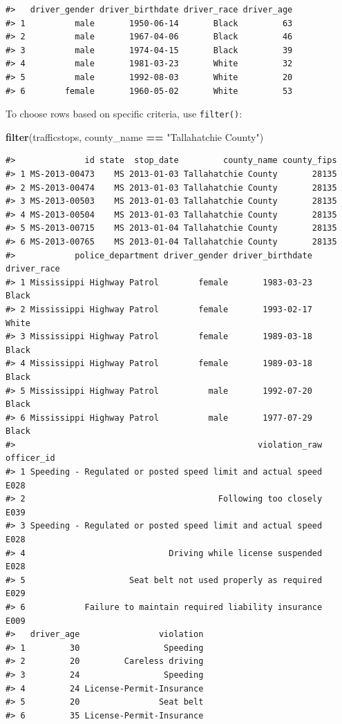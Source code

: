 \documentclass[]{book}
\newenvironment{Shaded}{\begin{snugshade}}{\end{snugshade}}
\newcommand{\KeywordTok}[1]{\textcolor[rgb]{0.13,0.29,0.53}{\textbf{#1}}}
\newcommand{\StringTok}[1]{\textcolor[rgb]{0.31,0.60,0.02}{#1}}
\newcommand{\OperatorTok}[1]{\textcolor[rgb]{0.81,0.36,0.00}{\textbf{#1}}}
\newcommand{\NormalTok}[1]{#1}
\theoremstyle{definition}
\theoremstyle{definition}
\theoremstyle{definition}
\theoremstyle{remark}
\begin{document}
\begin{verbatim}
#>   driver_gender driver_birthdate driver_race driver_age
#> 1          male       1950-06-14       Black         63
#> 2          male       1967-04-06       Black         46
#> 3          male       1974-04-15       Black         39
#> 4          male       1981-03-23       White         32
#> 5          male       1992-08-03       White         20
#> 6        female       1960-05-02       White         53
\end{verbatim}

To choose rows based on specific criteria, use \texttt{filter()}:

\begin{Shaded}
\begin{Highlighting}[]
\KeywordTok{filter}\NormalTok{(trafficstops, county_name }\OperatorTok{==}\StringTok{ "Tallahatchie County"}\NormalTok{)}
\end{Highlighting}
\end{Shaded}

\begin{verbatim}
#>              id state  stop_date         county_name county_fips
#> 1 MS-2013-00473    MS 2013-01-03 Tallahatchie County       28135
#> 2 MS-2013-00474    MS 2013-01-03 Tallahatchie County       28135
#> 3 MS-2013-00503    MS 2013-01-03 Tallahatchie County       28135
#> 4 MS-2013-00504    MS 2013-01-03 Tallahatchie County       28135
#> 5 MS-2013-00715    MS 2013-01-04 Tallahatchie County       28135
#> 6 MS-2013-00765    MS 2013-01-04 Tallahatchie County       28135
#>            police_department driver_gender driver_birthdate driver_race
#> 1 Mississippi Highway Patrol        female       1983-03-23       Black
#> 2 Mississippi Highway Patrol        female       1993-02-17       White
#> 3 Mississippi Highway Patrol        female       1989-03-18       Black
#> 4 Mississippi Highway Patrol        female       1989-03-18       Black
#> 5 Mississippi Highway Patrol          male       1992-07-20       Black
#> 6 Mississippi Highway Patrol          male       1977-07-29       Black
#>                                                 violation_raw officer_id
#> 1 Speeding - Regulated or posted speed limit and actual speed       E028
#> 2                                       Following too closely       E039
#> 3 Speeding - Regulated or posted speed limit and actual speed       E028
#> 4                             Driving while license suspended       E028
#> 5                     Seat belt not used properly as required       E029
#> 6            Failure to maintain required liability insurance       E009
#>   driver_age                violation
#> 1         30                 Speeding
#> 2         20         Careless driving
#> 3         24                 Speeding
#> 4         24 License-Permit-Insurance
#> 5         20                Seat belt
#> 6         35 License-Permit-Insurance
\end{verbatim}
\end{document}
